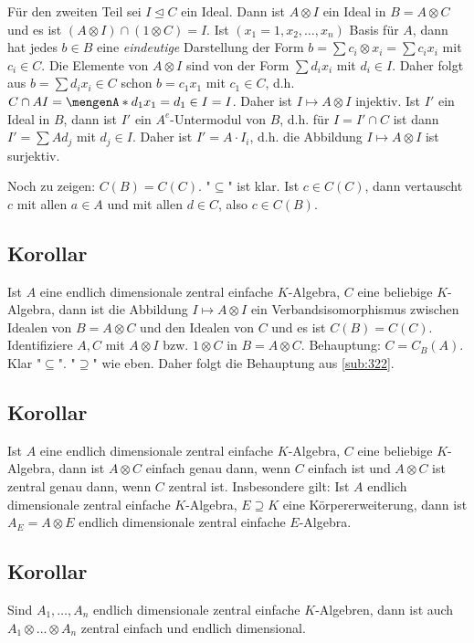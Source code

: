 Für den zweiten Teil sei $I \unlhd C$ ein Ideal. Dann ist $A \otimes I$ ein Ideal in $B = A \otimes C$ und es ist $(A \otimes I) \cap (1 \otimes C) = I$. Ist 
$(x_1=1, x_2, \ldots , x_n)$ Basis für $A$, dann hat jedes $b \in B$ eine \emph{eindeutige} Darstellung der Form $b= \sum c_i \otimes x_i = \sum c_i x_i$ mit
$c_i \in C$. Die Elemente von $A \otimes I$ sind von der Form $\sum d_i x_i$ mit $d_i \in I$. Daher folgt aus $b= \sum d_i x_i \in C$ schon $b= c_1 x_1$ mit $c_1 \in C$,
d.h. $C \cap A I = \set{d_1 x_1 = d_1 \in I} = I$. Daher ist $I \mapsto A \otimes I$ injektiv.
Ist $I'$ ein Ideal in $B$, dann ist $I'$ ein $A^e$-Untermodul von $B$, d.h. für $I = I' \cap C$ ist dann $I' = \sum A d_j$ mit $d_j \in I$. Daher ist $I' = A \cdot I_i$, 
d.h. die Abbildung $I \mapsto A \otimes I$ ist surjektiv.

Noch zu zeigen: $C(B) = C(C)$. "$\subseteq$"{} ist klar. Ist $c \in C(C)$, dann vertauscht $c$ mit allen $a \in A$ und mit allen $d \in C$, also $c \in C(B)$. \bewende

\subsection{Korollar} %
\label{sub:323}
Ist $A$ eine endlich dimensionale zentral einfache $K$-Algebra, $C$ eine beliebige $K$-Algebra, dann ist die Abbildung $I \mapsto A \otimes I$ ein Verbandsisomorphismus 
zwischen Idealen von $B = A \otimes C$ und den Idealen von $C$ und es ist $C(B) = C(C)$.
Identifiziere $A,C$ mit $A \otimes I$ bzw. $1 \otimes C$ in $B= A \otimes C$. Behauptung: $C = C_B(A)$. Klar "$\subseteq $"{}. "$\supseteq$"{} wie eben. Daher folgt die
Behauptung aus \ref{sub:322}. \bewende

\subsection{Korollar} %
\label{sub:324}
Ist $A$ eine endlich dimensionale zentral einfache $K$-Algebra, $C$ eine beliebige $K$-Algebra, dann ist $A \otimes C$ einfach genau dann, wenn $C$ einfach ist und 
$A \otimes C$ ist zentral genau dann, wenn $C$ zentral ist.
Insbesondere gilt: Ist $A$ endlich dimensionale zentral einfache $K$-Algebra, $E \supseteq K$ eine Körpererweiterung, dann ist $A_E = A \otimes E$ endlich dimensionale
zentral einfache $E$-Algebra.

\subsection{Korollar} %
\label{sub:325}
Sind $A_1, \ldots , A_n$ endlich dimensionale zentral einfache $K$-Algebren, dann ist auch $A_1 \otimes \ldots \otimes A_n$ zentral einfach und endlich dimensional.

